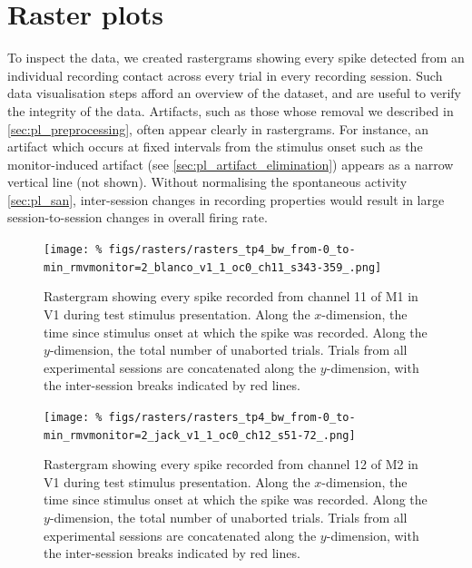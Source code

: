 \FloatBarrier
\section{Raster plots}
\label{sec:pl_rasters}

To inspect the data, we created rastergrams showing every spike detected from an individual recording contact across every trial in every recording session.
Such data visualisation steps afford an overview of the dataset, and are useful to verify the integrity of the data.
Artifacts, such as those whose removal we described in \autoref{sec:pl_preprocessing}, often appear clearly in rastergrams.
For instance, an artifact which occurs at fixed intervals from the stimulus onset such as the monitor-induced artifact (see \autoref{sec:pl_artifact_elimination}) appears as a narrow vertical line (not shown).
Without normalising the spontaneous activity \autoref{sec:pl_san}, inter-session changes in recording properties would result in large session-to-session changes in overall firing rate.


\begin{figure}[p]
    \centering
    \texttt{[image: \%
figs/rasters/rasters\_tp4\_bw\_from-0\_to-min\_rmvmonitor=2\_blanco\_v1\_1\_oc0\_ch11\_s343-359\_.png]}
    \caption{Rastergram showing every spike recorded from channel \num{11} of \ac{M1} in \ac{V1} during test stimulus presentation.
    Along the $x$-dimension, the time since stimulus onset at which the spike was recorded.
    Along the $y$-dimension, the total number of unaborted trials.
    Trials from all experimental sessions are concatenated along the $y$-dimension, with the inter-session breaks indicated by red lines.
}
    \label{fig:raster_blanco_v1}
\end{figure}


\begin{figure}[p]
    \centering
    \texttt{[image: \%
figs/rasters/rasters\_tp4\_bw\_from-0\_to-min\_rmvmonitor=2\_jack\_v1\_1\_oc0\_ch12\_s51-72\_.png]}
    \caption{Rastergram showing every spike recorded from channel \num{12} of \ac{M2} in \ac{V1} during test stimulus presentation.
    Along the $x$-dimension, the time since stimulus onset at which the spike was recorded.
    Along the $y$-dimension, the total number of unaborted trials.
    Trials from all experimental sessions are concatenated along the $y$-dimension, with the inter-session breaks indicated by red lines.
}
    \label{fig:raster_jack_v1}
\end{figure}


